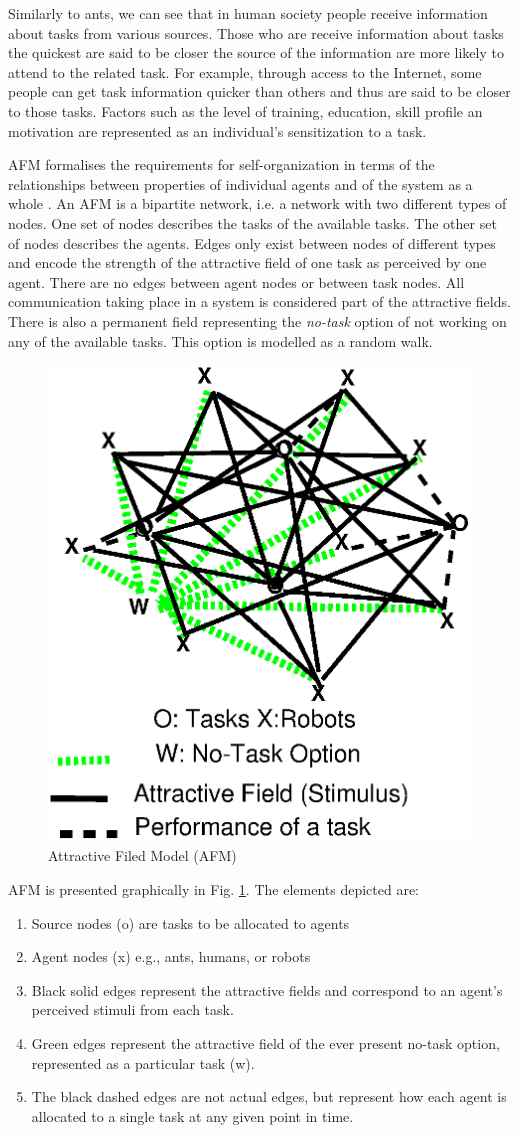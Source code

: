 \documentclass[smallcondensed]{svjour3}
\begin{document}
Similarly to ants, we can see that in human society people receive information about tasks from various sources.  Those who are receive information about tasks the quickest are said to be closer the source of the information are more likely to attend to the related task.  For example, through access to the Internet, some people can get task information quicker than others and thus are said to be closer to those tasks.  Factors such as the level of training, education, skill profile an motivation are represented as an individual's sensitization to a task.

AFM formalises the requirements for self-organization in terms of the relationships between properties of individual agents and of the system as a whole \citep{Arcaute+2008}.  An AFM is a bipartite network, i.e. a network with two different types of nodes.  One set of nodes describes the tasks of the available tasks.  The other set of nodes describes the agents.  Edges only exist between nodes of different types and encode the strength of the attractive field of one task as perceived by one agent.  There are no edges between agent nodes or between task nodes.  All communication taking place in a system is considered part of the attractive fields.  There is also a permanent field representing the {\em no-task} option of not working on any of the available tasks.  This option is modelled as a random walk.  
\begin{figure}[htp]
\centering
\includegraphics[height=0.5\textwidth, angle=0]{./AFM-Diag3.eps}
\caption{\small Attractive Filed Model (AFM)}
\label{fig:afm} 
\end{figure}
AFM is presented graphically in Fig. \ref{fig:afm}.  The elements depicted are:
\begin{enumerate}
\item Source nodes (o) are tasks to be allocated to agents
\item Agent nodes (x) e.g., ants, humans, or robots
\item Black solid edges represent the attractive fields and correspond to an agent's perceived stimuli from each task.
\item Green edges represent the attractive field of the ever present no-task option, represented as a particular task (w).
\item The black dashed edges are not actual edges, but represent how each agent is allocated to a single task at any given point in time.
\end{enumerate}
\end{document}
